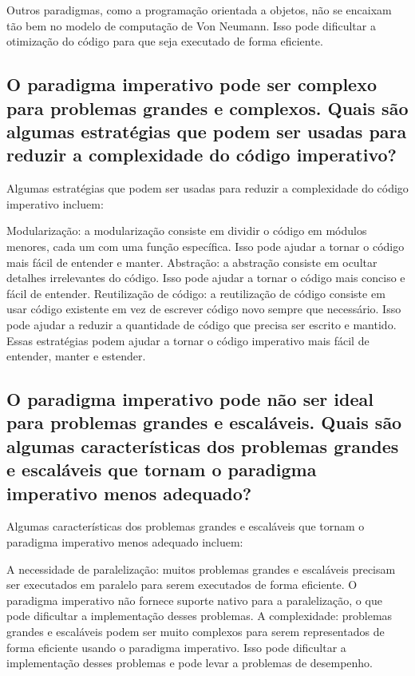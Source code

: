 Outros paradigmas, como a programação orientada a objetos, não se encaixam tão bem no modelo de computação de Von Neumann. Isso pode dificultar a otimização do código para que seja executado de forma eficiente.

\subsection{O paradigma imperativo pode ser complexo para problemas grandes e complexos. Quais são algumas estratégias que podem ser usadas para reduzir a complexidade do código imperativo?}

Algumas estratégias que podem ser usadas para reduzir a complexidade do código imperativo incluem:

Modularização: a modularização consiste em dividir o código em módulos menores, cada um com uma função específica. Isso pode ajudar a tornar o código mais fácil de entender e manter.
Abstração: a abstração consiste em ocultar detalhes irrelevantes do código. Isso pode ajudar a tornar o código mais conciso e fácil de entender.
Reutilização de código: a reutilização de código consiste em usar código existente em vez de escrever código novo sempre que necessário. Isso pode ajudar a reduzir a quantidade de código que precisa ser escrito e mantido.
Essas estratégias podem ajudar a tornar o código imperativo mais fácil de entender, manter e estender.

\subsection{O paradigma imperativo pode não ser ideal para problemas grandes e escaláveis. Quais são algumas características dos problemas grandes e escaláveis que tornam o paradigma imperativo menos adequado?}

Algumas características dos problemas grandes e escaláveis que tornam o paradigma imperativo menos adequado incluem:

A necessidade de paralelização: muitos problemas grandes e escaláveis precisam ser executados em paralelo para serem executados de forma eficiente. O paradigma imperativo não fornece suporte nativo para a paralelização, o que pode dificultar a implementação desses problemas.
A complexidade: problemas grandes e escaláveis podem ser muito complexos para serem representados de forma eficiente usando o paradigma imperativo. Isso pode dificultar a implementação desses problemas e pode levar a problemas de desempenho.

